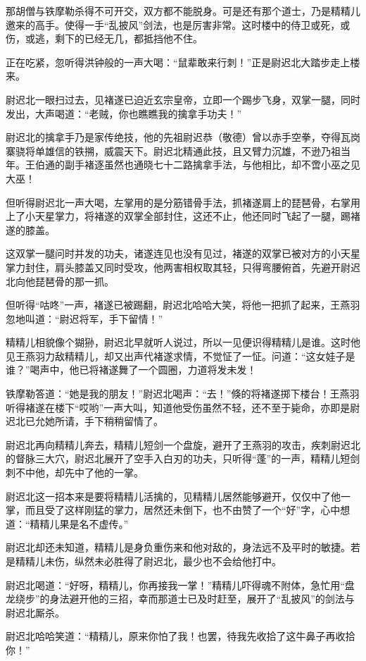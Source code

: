\documentclass[12pt,oneside]{book}
\begin{document}
那胡僧与铁摩勒杀得不可开交，双方都不能脱身。可是还有那个道士，乃是精精儿邀来的高手。使得一手``乱披风''剑法，也是厉害非常。这时楼中的侍卫或死，或伤，或逃，剩下的已经无几，都抵挡他不住。

正在吃紧，忽听得洪钟般的一声大喝：``鼠辈敢来行刺！''正是尉迟北大踏步走上楼来。

尉迟北一眼扫过去，见褚遂已迫近玄宗皇帝，立即一个踢步飞身，双掌一腿，同时发出，大声喝道：``老贼，你也瞧瞧我的擒拿手功夫！''

尉迟北的擒拿手乃是家传绝技，他的先祖尉迟恭（敬德）曾以赤手空拳，夺得瓦岗寨骁将单雄信的铁搠，威震天下。尉迟北精通此技，且又臂力沉雄，不逊乃祖当年。王伯通的副手褚逐虽然也通晓七十二路擒拿手法，与他相比，却不啻小巫之见大巫！

但听得尉迟北一声大喝，左掌用的是分筋错骨手法，抓褚遂肩上的琵琶骨，右掌用上了小天星掌力，将褚遂的双掌全部封住，这还不止，他还同时飞起了一腿，踢褚遂的膝盖。

这双掌一腿问时并发的功夫，诸遂连见也没有见过，褚遂的双掌已被对方的小天星掌力封住，肩头膝盖又同时受攻，他两害相权取其轻，只得弯腰俯首，先避开尉迟北向他琵琶骨的那一抓。

但听得``咕咚''一声，褚遂已被踢翻，尉迟北哈哈大笑，将他一把抓了起来，王燕羽忽地叫道：``尉迟将军，手下留情！''

精精儿相貌像个猢狲，尉迟北早就听人说过，所以一见便识得精精儿是谁。这时他见王燕羽力敌精精儿，却又出声代褚遂求情，不觉怔了一怔。问道：``这女娃子是谁？''喝声中，他已将褚遂舞了一个圆圈，力道将发未发！

铁摩勒答道：``她是我的朋友！''尉迟北喝声：``去！''倏的将褚遂掷下楼台！王燕羽听得褚遂在楼下``哎哟''一声大叫，知道他受伤虽然不轻，还不至于毙命，亦即是尉迟北已允她所请，手下稍稍留情了。

尉迟北再向精精儿奔去，精精儿短剑一个盘旋，避开了王燕羽的攻击，疾刺尉迟北的督脉三大穴，尉迟北展开了空手入白刃的功夫，只听得``蓬''的一声，精精儿短剑刺不中他，却先中了他的一掌。

尉迟北这一招本来是要将精精儿活擒的，见精精儿居然能够避开，仅仅中了他一掌，而且受了这样刚猛的掌力，居然还未倒下，也不由赞了一个``好''字，心中想道：``精精儿果是名不虚传。''

尉迟北却还未知道，精精儿是身负重伤来和他对敌的，身法远不及平时的敏捷。若是精精儿未伤，纵然未必胜得了尉迟北，最少也不会给他打中。

尉迟北喝道：``好呀，精精儿，你再接我一掌！''精精儿吓得魂不附体，急忙用``盘龙绕步''的身法避开他的三招，幸而那道士已及时赶至，展开了``乱披风''的剑法与尉迟北厮杀。

尉迟北哈哈笑道：``精精儿，原来你怕了我！也罢，待我先收拾了这牛鼻子再收拾你！''
\end{document}
